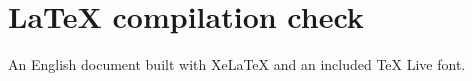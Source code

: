 \documentclass{article}
\begin{document}
\section*{LaTeX compilation check}
An English document built with XeLaTeX and an included TeX Live font.
\end{document}
